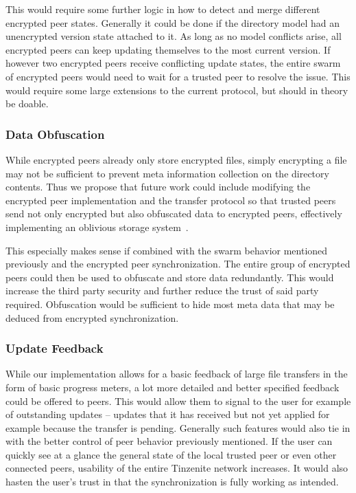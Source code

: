 This would require some further logic in how to detect and merge different encrypted peer states.
Generally it could be done if the directory model had an unencrypted version state attached to it.
As long as no model conflicts arise, all encrypted peers can keep updating themselves to the most current version.
If however two encrypted peers receive conflicting update states, the entire swarm of encrypted peers would need to wait for a trusted peer to resolve the issue.
This would require some large extensions to the current protocol, but should in theory be doable.

\subsubsection{Data Obfuscation}
\label{subs:Data Obfuscation}

While encrypted peers already only store encrypted files, simply encrypting a file may not be sufficient to prevent meta information collection on the directory contents.
Thus we propose that future work could include modifying the encrypted peer implementation and the transfer protocol so that trusted peers send not only encrypted but also obfuscated data to encrypted peers, effectively implementing an oblivious storage system~\cite{goldreich1996software}.

This especially makes sense if combined with the swarm behavior mentioned previously and the encrypted peer synchronization.
The entire group of encrypted peers could then be used to obfuscate and store data redundantly.
This would increase the third party security and further reduce the trust of said party required.
Obfuscation would be sufficient to hide most meta data that may be deduced from encrypted synchronization.

\subsubsection{Update Feedback}
\label{subs:Update Feedback}

While our implementation allows for a basic feedback of large file transfers in the form of basic progress meters, a lot more detailed and better specified feedback could be offered to peers.
This would allow them to signal to the user for example of outstanding updates -- updates that it has received but not yet applied for example because the transfer is pending.
Generally such features would also tie in with the better control of peer behavior previously mentioned.
If the user can quickly see at a glance the general state of the local trusted peer or even other connected peers, usability of the entire Tinzenite network increases.
It would also hasten the user's trust in that the synchronization is fully working as intended.

